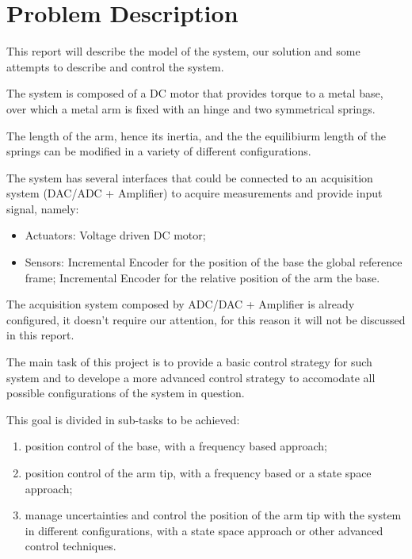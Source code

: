 \chapter{Problem Description}
\label{cha:problem_description}

    This report will describe the model of the system, our solution and some attempts to describe and control the system.

    The system is composed of a DC motor that provides torque to a metal base, over which a metal arm is fixed with an hinge and two symmetrical springs.

    The length of the arm, hence its inertia, and the the equilibiurm length of the springs can be modified in a variety of different configurations.

    The system has several interfaces that could be connected to an acquisition system (DAC/ADC + Amplifier) to acquire measurements and provide input signal, namely:
    \begin{itemize}
        \item Actuators:
            \subitem Voltage driven DC motor;
        \item Sensors:
            \subitem Incremental Encoder for the position of the base \wrt the global reference frame;
            \subitem Incremental Encoder for the relative position of the arm \wrt the base.
    \end{itemize}
    The acquisition system composed by ADC/DAC + Amplifier is already configured, it doesn't require our attention, for this reason it will not be discussed in this report.

    The main task of this project is to provide a basic control strategy for such system and to develope a more advanced control strategy to accomodate all possible configurations of the system in question.
    
    This goal is divided in sub-tasks to be achieved:
    \begin{enumerate}
        \item position control of the base, with a frequency based approach;
        \item position control of the arm tip, with a frequency based or a state space approach;
        \item manage uncertainties and control the position of the arm tip with the system in different configurations, with a state space approach or other advanced control techniques.
    \end{enumerate}






